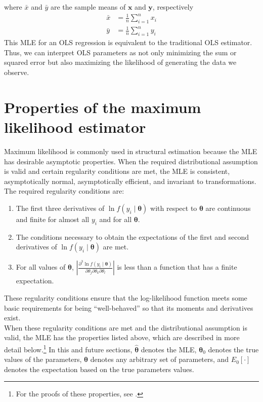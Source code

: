 \documentclass[11pt,letterpaper]{article}
\begin{document}
where $\bar{x}$ and $\bar{y}$ are the sample means of $\bm{x}$ and $\bm{y}$, respectively
\begin{align*}
  \bar{x} & = \frac{1}{n} \sum_{i = 1}^n x_i \\
  \bar{y} & = \frac{1}{n} \sum_{i = 1}^n y_i
\end{align*}
This MLE for an OLS regression is equivalent to the traditional OLS estimator. Thus, we can interpret OLS parameters as not only minimizing the sum or squared error but also maximizing the likelihood of generating the data we observe.

\section{Properties of the maximum likelihood estimator}

Maximum likelihood is commonly used in structural estimation because the MLE has desirable asymptotic properties. When the required distributional assumption is valid and certain regularity conditions are met, the MLE is consistent, asymptotically normal, asymptotically efficient, and invariant to transformations. \\

\noindent The required regularity conditions are:
\begin{enumerate}
  \item The first three derivatives of $\ln f(y_i \mid \bm{\theta})$ with respect to $\bm{\theta}$ are continuous and finite for almost all $y_i$ and for all $\bm{\theta}$.
  \item The conditions necessary to obtain the expectations of the first and second derivatives of ${\ln f(y_i \mid \bm{\theta})}$ are met.
  \item For all values of $\bm{\theta}$, $\left\vert \frac{\partial^3 \ln f(y_i \mid \bm{\theta})}{\partial \theta_j \partial \theta_k \partial \theta_l} \right\vert$ is less than a function that has a finite expectation.
\end{enumerate}
These regularity conditions ensure that the log-likelihood function meets some basic requirements for being ``well-behaved'' so that its moments and derivatives exist. \\

\noindent When these regularity conditions are met and the distributional assumption is valid, the MLE has the properties listed above, which are described in more detail below.\footnote{For the proofs of these properties, see .} In this and future sections, $\widehat{\bm{\theta}}$ denotes the MLE, $\bm{\theta}_0$ denotes the true values of the parameters, $\bm{\theta}$ denotes any arbitrary set of parameters, and $E_0[\cdot]$ denotes the expectation based on the true parameters values. 
\end{document}
